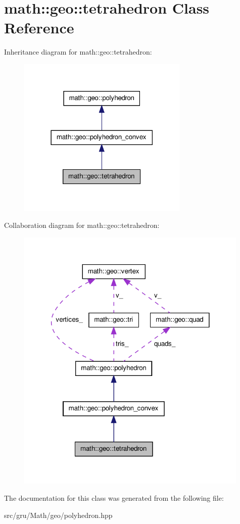 \hypertarget{classmath_1_1geo_1_1tetrahedron}{\section{math\-:\-:geo\-:\-:tetrahedron \-Class \-Reference}
\label{classmath_1_1geo_1_1tetrahedron}
}


\-Inheritance diagram for math\-:\-:geo\-:\-:tetrahedron\-:\nopagebreak
\begin{figure}[H]
\begin{center}
\leavevmode
\includegraphics[width=230pt]{classmath_1_1geo_1_1tetrahedron__inherit__graph}
\end{center}
\end{figure}


\-Collaboration diagram for math\-:\-:geo\-:\-:tetrahedron\-:\nopagebreak
\begin{figure}[H]
\begin{center}
\leavevmode
\includegraphics[width=314pt]{classmath_1_1geo_1_1tetrahedron__coll__graph}
\end{center}
\end{figure}


\-The documentation for this class was generated from the following file\-:\begin{DoxyCompactItemize}
\item 
src/gru/\-Math/geo/polyhedron.\-hpp\end{DoxyCompactItemize}
